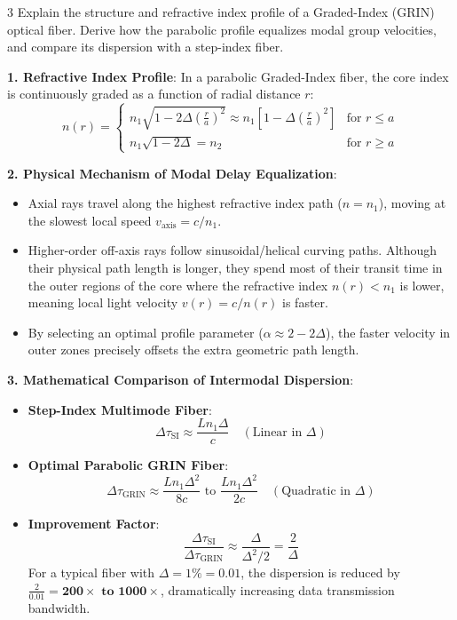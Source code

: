 \begin{theoryq}{3}
Explain the structure and refractive index profile of a Graded-Index (GRIN) optical fiber. Derive how the parabolic profile equalizes modal group velocities, and compare its dispersion with a step-index fiber.
\end{theoryq}
\begin{theorysol}
\textbf{1. Refractive Index Profile}:
In a parabolic Graded-Index fiber, the core index is continuously graded as a function of radial distance $r$:
\begin{equation}
n(r) = \begin{cases}
n_1 \sqrt{1 - 2\Delta\left(\frac{r}{a}\right)^2} \approx n_1 \left[1 - \Delta\left(\frac{r}{a}\right)^2\right] & \text{for } r \le a \\
n_1 \sqrt{1 - 2\Delta} = n_2 & \text{for } r \ge a
\end{cases}
\end{equation}

\textbf{2. Physical Mechanism of Modal Delay Equalization}:
\begin{itemize}
    \item Axial rays travel along the highest refractive index path ($n = n_1$), moving at the slowest local speed $v_{\text{axis}} = c/n_1$.
    \item Higher-order off-axis rays follow sinusoidal/helical curving paths. Although their physical path length is longer, they spend most of their transit time in the outer regions of the core where the refractive index $n(r) < n_1$ is lower, meaning local light velocity $v(r) = c/n(r)$ is faster.
    \item By selecting an optimal profile parameter ($\alpha \approx 2 - 2\Delta$), the faster velocity in outer zones precisely offsets the extra geometric path length.
\end{itemize}

\textbf{3. Mathematical Comparison of Intermodal Dispersion}:
\begin{itemize}
    \item \textbf{Step-Index Multimode Fiber}:
    \begin{equation}
    \Delta \tau_{\text{SI}} \approx \frac{L n_1 \Delta}{c} \quad (\text{Linear in } \Delta)
    \end{equation}
    \item \textbf{Optimal Parabolic GRIN Fiber}:
    \begin{equation}
    \Delta \tau_{\text{GRIN}} \approx \frac{L n_1 \Delta^2}{8 c} \text{ to } \frac{L n_1 \Delta^2}{2 c} \quad (\text{Quadratic in } \Delta)
    \end{equation}
    \item \textbf{Improvement Factor}:
    \begin{equation}
    \frac{\Delta \tau_{\text{SI}}}{\Delta \tau_{\text{GRIN}}} \approx \frac{\Delta}{\Delta^2 / 2} = \frac{2}{\Delta}
    \end{equation}
    For a typical fiber with $\Delta = 1\% = 0.01$, the dispersion is reduced by $\frac{2}{0.01} = \mathbf{200\times \text{ to } 1000\times}$, dramatically increasing data transmission bandwidth.
\end{itemize}

\end{theorysol}

